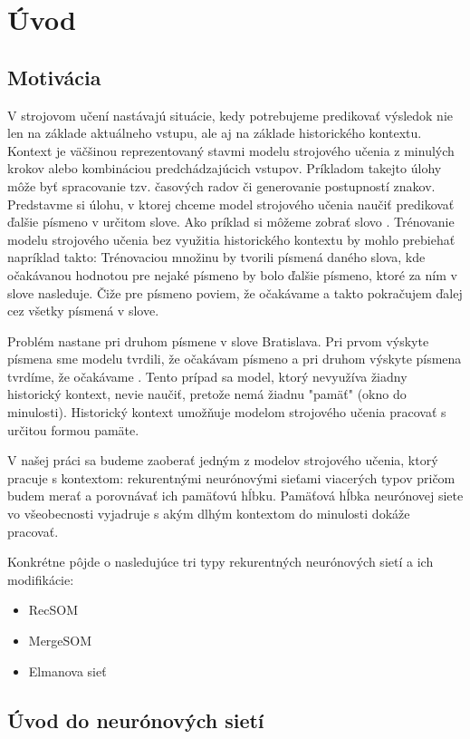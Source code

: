 \chapter{Úvod}

\section{Motivácia}
V strojovom učení nastávajú situácie, kedy potrebujeme predikovať výsledok nie len na 
základe aktuálneho vstupu, ale aj na základe historického kontextu. 
Kontext je väčšinou reprezentovaný stavmi modelu strojového učenia z minulých krokov alebo kombináciou predchádzajúcich vstupov.
Príkladom takejto úlohy môže byť spracovanie tzv. časových radov či generovanie postupností znakov.
Predstavme si úlohu, v ktorej chceme model strojového učenia naučiť predikovať ďalšie písmeno v určitom slove. 
Ako príklad si môžeme zobrať slovo . 
Trénovanie modelu strojového učenia bez využitia historického kontextu by mohlo prebiehať napríklad takto:
Trénovaciou množinu by tvorili písmená daného slova, kde očakávanou hodnotou pre nejaké písmeno by bolo ďalšie písmeno, ktoré za ním v slove nasleduje.
Čiže pre písmeno  poviem, že očakávame  a takto pokračujem ďalej cez všetky písmená v slove.

Problém nastane pri druhom písmene  v slove Bratislava. Pri prvom výskyte písmena  sme modelu tvrdili, že očakávam písmeno  a 
pri druhom výskyte písmena  tvrdíme, že očakávame . 
Tento prípad sa model, ktorý nevyužíva žiadny historický kontext, nevie naučiť, pretože nemá žiadnu "pamäť" (okno do minulosti). 
Historický kontext umožňuje modelom strojového učenia pracovať s určitou formou pamäte.

V našej práci sa budeme zaoberať jedným z modelov strojového učenia, 
ktorý pracuje s kontextom: rekurentnými neurónovými sieťami viacerých typov pričom
budem merať a porovnávať ich pamäťovú hĺbku. 
Pamäťová hĺbka neurónovej siete vo všeobecnosti vyjadruje s akým dlhým kontextom do minulosti dokáže pracovať.

Konkrétne pôjde o nasledujúce tri typy rekurentných neurónových sietí a ich modifikácie:
\begin{itemize}
	\item RecSOM
	\item MergeSOM
	\item Elmanova sieť
\end{itemize}

\section{Úvod do neurónových sietí}

